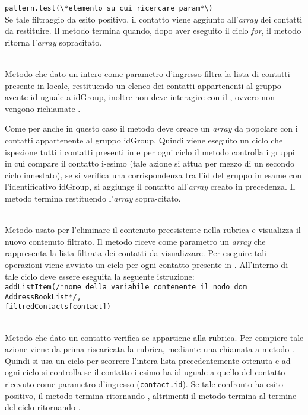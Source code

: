 \begin{description}
\verb|pattern.test(\*elemento su cui ricercare param*\)|\\

Se tale filtraggio da esito positivo, il contatto viene aggiunto all'\textit{array} dei contatti da restituire. Il metodo termina quando, dopo aver eseguito il ciclo \textit{for}, il metodo ritorna l'\textit{array} sopracitato.

\item{}\\
Metodo che dato un intero come parametro d'ingresso filtra la lista di contatti presente in locale, restituendo un elenco dei contatti appartenenti al gruppo avente id uguale a idGroup, inoltre non deve interagire con il , ovvero non vengono richiamate . 

Come per  anche in questo caso il metodo deve creare un \textit{array} da popolare con i contatti appartenente al gruppo idGroup. Quindi viene eseguito un ciclo  che ispezione tutti i contatti presenti in  e per ogni ciclo il metodo controlla i gruppi in cui compare il contatto i-esimo (tale azione si attua per mezzo di un secondo ciclo innestato), se si verifica una corrispondenza tra l'id del gruppo in esame con l'identificativo idGroup, si aggiunge il contatto all'\textit{array} creato in precedenza. Il metodo termina restituendo l'\textit{array} sopra-citato.

\item{}\\
Metodo usato per l'eliminare il contenuto preesistente nella rubrica e visualizza il nuovo contenuto filtrato. Il metodo riceve come parametro un \textit{array} che rappresenta la lista filtrata dei contatti da visualizzare. Per eseguire tali operazioni viene avviato un ciclo  per ogni contatto presente in . All'interno di tale ciclo deve essere eseguita la seguente istruzione:\\

\verb|addListItem(/*nome della variabile contenente il nodo dom AddressBookList*/,|\\
\verb|filtredContacts[contact])|\\

\item{}\\
Metodo che dato un contatto verifica se appartiene alla rubrica. Per compiere tale azione viene da prima riscaricata la rubrica, mediante una chiamata a metodo . Quindi si usa un ciclo  per scorrere l'intera lista precedentemente ottenuta e ad ogni ciclo si controlla se il contatto i-esimo ha id uguale a quello del contatto ricevuto come parametro d'ingresso (\texttt{contact.id}). Se tale confronto ha esito positivo, il metodo termina ritornando , altrimenti il metodo termina al termine del ciclo  ritornando .


\end{description}
